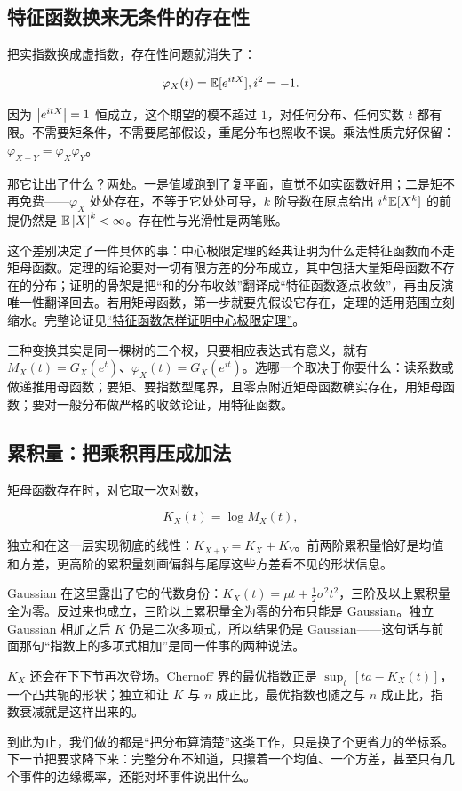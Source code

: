 \subsection{特征函数换来无条件的存在性}

把实指数换成虚指数，存在性问题就消失了：

\[
\varphi_X(t)=\mathbb{E}[e^{itX}],\space i^2=-1.
\]

因为 \(\left|e^{itX}\right|=1\) 恒成立，这个期望的模不超过 \(1\)，对任何分布、任何实数 \(t\) 都有限。不需要矩条件，不需要尾部假设，重尾分布也照收不误。乘法性质完好保留：\(\varphi_{X+Y}=\varphi_X\varphi_Y\)。

那它让出了什么？两处。一是值域跑到了复平面，直觉不如实函数好用；二是矩不再免费——\(\varphi_X\) 处处存在，不等于它处处可导，\(k\) 阶导数在原点给出 \(i^k\mathbb{E}[X^k]\) 的前提仍然是 \(\mathbb{E}\left|X\right|^k<\infty\)。存在性与光滑性是两笔账。

这个差别决定了一件具体的事：中心极限定理的经典证明为什么走特征函数而不走矩母函数。定理的结论要对一切有限方差的分布成立，其中包括大量矩母函数不存在的分布；证明的骨架是把``和的分布收敛''翻译成``特征函数逐点收敛''，再由反演唯一性翻译回去。若用矩母函数，第一步就要先假设它存在，定理的适用范围立刻缩水。完整论证见\hyperref[sec:05-Probability/08-Limit-Theorems/04]{``特征函数怎样证明中心极限定理''}。

三种变换其实是同一棵树的三个杈，只要相应表达式有意义，就有 \(M_X(t)=G_X(e^t)\)、\(\varphi_X(t)=G_X(e^{it})\)。选哪一个取决于你要什么：读系数或做递推用母函数；要矩、要指数型尾界，且零点附近矩母函数确实存在，用矩母函数；要对一般分布做严格的收敛论证，用特征函数。

\subsection{累积量：把乘积再压成加法}

矩母函数存在时，对它取一次对数，

\[
K_X(t)=\log M_X(t),
\]

独立和在这一层实现彻底的线性：\(K_{X+Y}=K_X+K_Y\)。前两阶累积量恰好是均值和方差，更高阶的累积量刻画偏斜与尾厚这些方差看不见的形状信息。

Gaussian 在这里露出了它的代数身份：\(K_X(t)=\mu t+\frac12\sigma^2t^2\)，三阶及以上累积量全为零。反过来也成立，三阶以上累积量全为零的分布只能是 Gaussian。独立 Gaussian 相加之后 \(K\) 仍是二次多项式，所以结果仍是 Gaussian——这句话与前面那句``指数上的多项式相加''是同一件事的两种说法。

\(K_X\) 还会在下下节再次登场。Chernoff 界的最优指数正是 \(\sup_t\,[ta-K_X(t)]\)，一个凸共轭的形状；独立和让 \(K\) 与 \(n\) 成正比，最优指数也随之与 \(n\) 成正比，指数衰减就是这样出来的。

到此为止，我们做的都是``把分布算清楚''这类工作，只是换了个更省力的坐标系。下一节把要求降下来：完整分布不知道，只攥着一个均值、一个方差，甚至只有几个事件的边缘概率，还能对坏事件说出什么。
